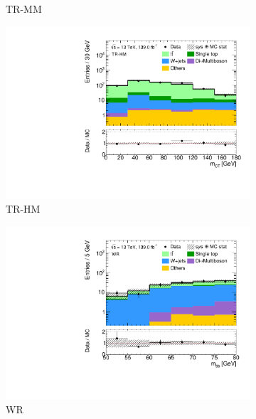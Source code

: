 \begin{figure}
\begin{subfigure}[b]{0.5\linewidth}
		\caption{TR-MM\label{fig:signal_contamination_TRMM}}
	\end{subfigure}\hfill
	\begin{subfigure}[b]{0.5\linewidth}
		\centering\includegraphics[width=1.0\textwidth]{1Lbb_TR-HM_mct}
		\caption{TR-HM\label{fig:signal_contamination_TRHM}}
	\end{subfigure}\hfill
	\begin{subfigure}[b]{0.5\linewidth}
		\centering\includegraphics[width=1.0\textwidth]{1Lbb_WR_mbb}
		\caption{WR\label{fig:signal_contamination_WR}}
	\end{subfigure}\hfill
	\begin{subfigure}[b]{0.5\linewidth}

\end{subfigure}
\end{figure}
